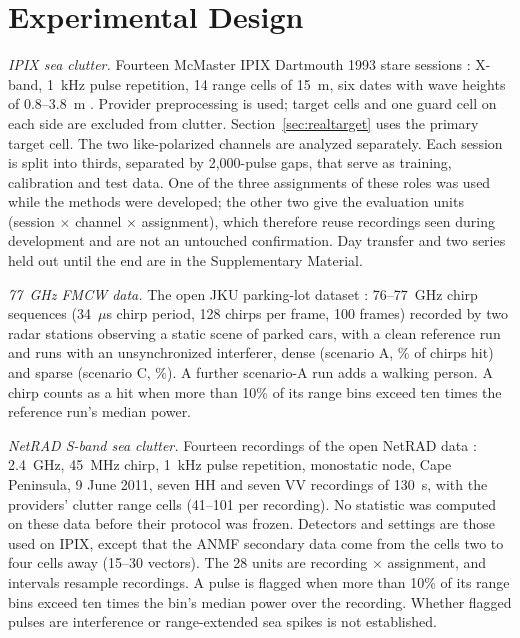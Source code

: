 \documentclass[journal]{IEEEtran}
\begin{document}
\section{Experimental Design}\label{sec:design}
\emph{IPIX sea clutter.} Fourteen McMaster IPIX Dartmouth 1993 stare sessions \cite{ipixweb}: X-band, 1~kHz pulse repetition, 14 range cells of 15~m, six dates with wave heights of 0.8--3.8~m \cite{haykin1995}. Provider preprocessing is used; target cells and one guard cell on each side are excluded from clutter. Section~\ref{sec:realtarget} uses the primary target cell. The two like-polarized channels are analyzed separately. Each session is split into thirds, separated by 2,000-pulse gaps, that serve as training, calibration and test data. One of the three assignments of these roles was used while the methods were developed; the other two give the \NUnitsConf{} evaluation units (session $\times$ channel $\times$ assignment), which therefore reuse recordings seen during development and are not an untouched confirmation. Day transfer and two series held out until the end are in the Supplementary Material.

\emph{77~GHz FMCW data.} The open JKU parking-lot dataset \cite{jku2026}: 76--77~GHz chirp sequences (34~$\mu$s chirp period, 128 chirps per frame, 100 frames) recorded by two radar stations observing a static scene of parked cars, with a clean reference run and runs with an unsynchronized interferer, dense (scenario A, \JHitA\% of chirps hit) and sparse (scenario C, \JHitC\%). A further scenario-A run adds a walking person. A chirp counts as a hit when more than 10\% of its range bins exceed ten times the reference run's median power.

\emph{NetRAD S-band sea clutter.} Fourteen recordings of the open NetRAD data \cite{netrad2026,fioranelli2016netrad}: 2.4~GHz, 45~MHz chirp, 1~kHz pulse repetition, monostatic node, Cape Peninsula, 9 June 2011, seven HH and seven VV recordings of 130~s, with the providers' clutter range cells (41--101 per recording). No statistic was computed on these data before their protocol was frozen. Detectors and settings are those used on IPIX, except that the ANMF secondary data come from the cells two to four cells away (15--30 vectors). The 28 units are recording $\times$ assignment, and intervals resample recordings. A pulse is flagged when more than 10\% of its range bins exceed ten times the bin's median power over the recording. Whether flagged pulses are interference or range-extended sea spikes is not established.
\end{document}

